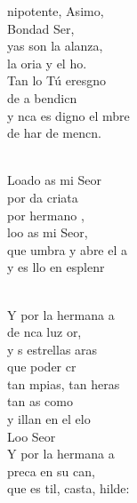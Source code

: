 \documentclass[12pt]{article}
\begin{document}
\begin{multicols*}{2}
\begin{cancion}%
	nipotente, Asimo,  \\
	Bondad Ser,\\
	yas son la alanza, \\
	la oria y el ho.\\
	Tan lo Tú eresgno  \\
	de a bendicn\\
	y nca es digno el mbre\\
	de har de mencn. \\\jump\\
	\begin{chorus}%
	Loado as mi Seor\\
	por da criata\\
	por  hermano ,\\
	loo as mi Seor,\\
	que umbra y abre el a \\
	y es llo en esplenr\\
	\end{chorus}%
	\jump\\
	Y por la hermana a\\
	de nca luz or,\\
	y s estrellas aras \\
	que  poder cr\\
	tan mpias, tan heras\\
	tan as como \\
	y illan en el elo\\
	Loo Seor\\
\jump
	Y por la hermana a \\
	preca en su can,\\
	que es til, casta, hilde: \\

\end{cancion}
\end{multicols*}
\end{document}
